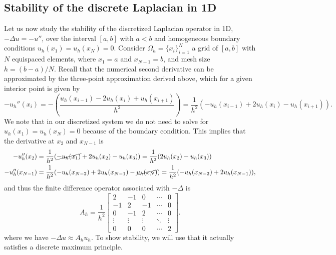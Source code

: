 \documentclass{article}
\begin{document}
\subsection{Stability of the discrete Laplacian in 1D}
Let us now study the stability of the discretized Laplacian operator in 1D, $-\Delta u = -u''$, over the interval $[a,b]$ with $a<b$ and homogeneous boundary conditions $u_h(x_1) = u_h(x_N) = 0$. Consider $\Omega_h = \{x_i\}_{i=1}^N$ a grid of $[a,b]$ with $N$ equispaced elements, where $x_1=a$ and $x_{N-1}=b$, and mesh size $h=(b-a)/N$. Recall that the numerical second derivative can be approximated by the three-point approximation derived above, which for a given interior point is given by
$$-u_h''(x_i) = -\left(\frac{u_h(x_{i-1}) - 2u_h(x_i) + u_h(x_{i+1})}{h^2}\right) = \frac{1}{h^2}(-u_h(x_{i-1}) + 2u_h(x_i) - u_h(x_{i+1})).$$
We note that in our discretized system we do not need to solve for $u_h(x_1)=u_h(x_N)=0$ because of the boundary condition. This implies that the derivative at $x_2$ and $x_{N-1}$ is
\begin{align*}
    -u_h''(x_2) &= \frac{1}{h^2}(\cancel{-u_h(x_{1})} + 2u_h(x_2) - u_h(x_{3})) = \frac{1}{h^2}(2u_h(x_2) - u_h(x_{3}))\\
    -u_h''(x_{N-1}) &= \frac{1}{h^2}(-u_h(x_{N-2}) + 2u_h(x_{N-1}) - \cancel{u_h(x_{N})}) = \frac{1}{h^2}(-u_h(x_{N-2}) + 2u_h(x_{N-1})),\\
\end{align*}
and thus the finite difference operator associated with $-\Delta$ is
$$A_h = \frac{1}{h^2} \begin{bmatrix} 2 & -1 & 0 & \cdots & 0 \\ -1 & 2 & -1 & \cdots & 0 \\ 0 & -1 & 2 & \cdots & 0 \\ \vdots & \vdots & \vdots & \ddots & \vdots \\ 0 & 0 & 0 & \cdots & 2\end{bmatrix}.$$
where we have $-\Delta u \approx A_h u_h$. To show stability, we will use that it actually satisfies a discrete maximum principle. 
\end{document}
